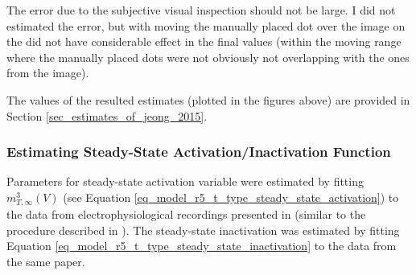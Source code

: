 \documentclass[../../workflow.tex]{subfiles}
\begin{document}
\begin{note}
    The error due to the subjective visual inspection should not be large. I did not estimated the
    error, but with moving the manually placed dot over the image on the did not have considerable
    effect in the final values (within the moving range where the manually placed dots were not
    obviously not overlapping with the ones from the image).

    The values of the resulted estimates (plotted in the figures above) are provided in
    Section \ref{sec_estimates_of_jeong_2015}.
\end{note}


\subsubsection{Estimating Steady-State Activation/Inactivation Function}

Parameters for steady-state activation variable were estimated by fitting
$m_{T,\infty}^3(V)$ (see Equation \ref{eq_model_r5_t_type_steady_state_activation}) to the data
from electrophysiological recordings presented in \parencite{jeongCaa1TFlyTtype2015} (similar to
the procedure described in \parencite{coulterCalciumCurrentsRat1989}). The steady-state inactivation
was estimated by fitting Equation \ref{eq_model_r5_t_type_steady_state_inactivation} to the
data from the same paper.
\end{document}
